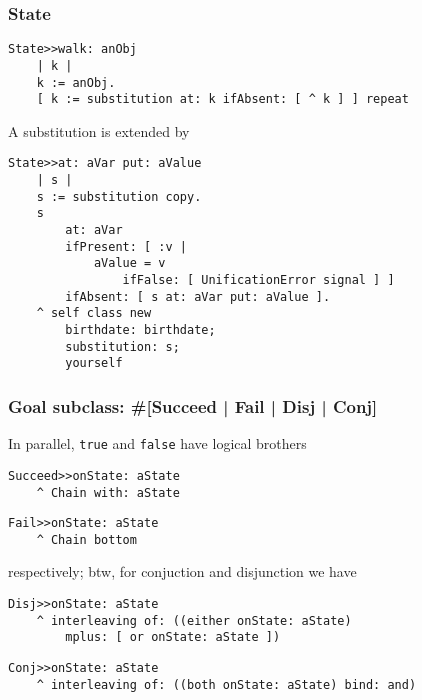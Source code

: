 \documentclass{beamer}
\begin{document}
\begin{frame}[fragile]
\frametitle{State}
\begin{verbatim}
State>>walk: anObj
    | k |
    k := anObj.
    [ k := substitution at: k ifAbsent: [ ^ k ] ] repeat
\end{verbatim}
A substitution is extended by
\begin{verbatim}
State>>at: aVar put: aValue
    | s |
    s := substitution copy.
    s
        at: aVar
        ifPresent: [ :v |
            aValue = v
                ifFalse: [ UnificationError signal ] ]
        ifAbsent: [ s at: aVar put: aValue ].
    ^ self class new
        birthdate: birthdate;
        substitution: s;
        yourself
\end{verbatim}
\end{frame}

\begin{frame}[fragile]
\frametitle{Goal subclass: \#[Succeed | Fail | Disj | Conj]}
In parallel, \texttt{true} and \texttt{false} have logical brothers
\begin{verbatim}
Succeed>>onState: aState
    ^ Chain with: aState
\end{verbatim}
\begin{verbatim}
Fail>>onState: aState
    ^ Chain bottom
\end{verbatim}
respectively; btw, for conjuction and disjunction we have
\begin{verbatim}
Disj>>onState: aState
    ^ interleaving of: ((either onState: aState)
        mplus: [ or onState: aState ])
\end{verbatim}
\begin{verbatim}
Conj>>onState: aState
    ^ interleaving of: ((both onState: aState) bind: and)
\end{verbatim}
\end{frame}
\end{document}

